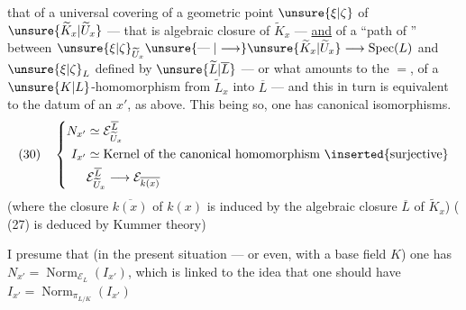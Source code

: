that of a universal covering   of a geometric point $\unsure{\xi|\zeta}$ of $\unsure{\widetilde K_x|\widetilde U_x}$ --- that is  algebraic closure of $\widetilde K_x$ --- \uline{and} of a  ``path of '' between $\unsure{\xi|\zeta}_{\widetilde U_x}\unsure{\mathrel{\text{---}}|\longrightarrow}\unsure{\widetilde K_x|\widetilde U_x}\longrightarrow\operatorname{Spec}(L)$ and $\unsure{\xi|\zeta}_L$ defined by $\unsure{\widetilde L|\overline L}$ --- or what amounts to the $=$,  of a $\unsure{K|L}$-homomorphism from   $\widetilde L_x$ into $\overline L$ --- and this in turn is equivalent to the datum of an $x'$,  as above. This being so, one has canonical isomorphisms.
\[
(30)\quad\left\{\begin{aligned}
N_{x'}&\simeq\mathcal E_{\widetilde U_x}^{\overline L}\\
I_{x'}&\simeq\text{Kernel of the canonical homomorphism }\inserted{\text{surjective}}\\
&\mathcal E_{\widetilde U_x}^{\overline L}\longrightarrow\mathcal E_{\overline{k(x)}}
\end{aligned}\right.
\]
(where the  closure $\overline{k(x)}$ of $k(x)$ is induced by the algebraic closure $\overline L$ of $\widetilde K_x$)
( (27) is deduced by Kummer theory)

I presume that (in the present situation --- or even, with a base field $K$) one has $N_{x'}=\operatorname{Norm}_{\mathcal E_L}(I_{x'})$,  which is linked to the idea that one should have $I_{x'}=\operatorname{Norm}_{\pi_{L/K}}(I_{x'})$

